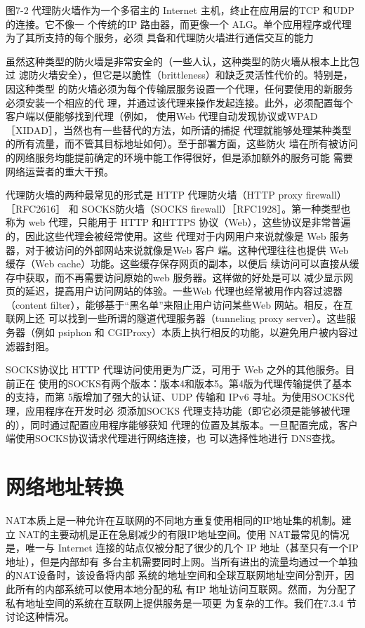 图7-2 代理防火墙作为一个多宿主的 Internet 主机，终止在应用层的TCP 和UDP 的连接。它不像一
个传统的IP 路由器，而更像一个 ALG。单个应用程序或代理为了其所支持的每个服务，必须
具备和代理防火墙进行通信交互的能力

虽然这种类型的防火墙是非常安全的（一些人认，这种类型的防火墻从根本上比包过
滤防火墻安全），但它是以脆性（brittleness）和缺乏灵活性代价的。特别是，因这种类型
的防火墙必须为每个传输层服务设置一个代理，任何要使用的新服务必须安装一个相应的代
理，并通过该代理来操作发起连接。此外，必须配置每个客户端以便能够找到代理（例如，
使用Web 代理自动发现协议或WPAD［XIDAD］，当然也有一些替代的方法，如所请的捕捉
代理就能够处理某种类型的所有流量，而不管其目标地址如何）。至于部署方面，这些防火
墙在所有被访问的网络服务均能提前确定的环境中能工作得很好，但是添加额外的服务可能
需要网络运营者的重大干预。

代理防火墻的两种最常见的形式是 HTTP 代理防火墙（HTTP proxy firewall） ［RFC2616］
和 SOCKS防火墙（SOCKS firewall）［RFC1928］。第一种类型也称为 web 代理，只能用于
HTTP 和HTTPS 协议（Web），这些协议是非常普遍的，因此这些代理会被经常使用。这些
代理对于内网用户来说就像是 Web 服务器，对于被访问的外部网站来说就像是Web 客户
端。这种代理往往也提供 Web 缓存（Web cache）功能。这些缓存保存网页的副本，以便后
续访问可以直接从缓存中获取，而不再需要访问原始的web 服务器。这样做的好处是可以
减少显示网页的延迟，提高用户访问网站的体验。一些Web 代理也经常被用作内容过滤器
（content filter），能够基于“黑名单”来阻止用户访问某些Web 网站。相反，在互联网上还
可以找到一些所谓的隧道代理服务器（tunneling proxy server）。这些服务器（例如 psiphon 和
CGIProxy）本质上执行相反的功能，以避免用户被内容过滤器封阻。

SOCKS协议比 HTTP 代理访问使用更为广泛，可用于 Web 之外的其他服务。目前正在
使用的SOCKS有两个版本：版本4和版本5。第4版为代理传输提供了基本的支持，而第
5版增加了强大的认证、UDP 传输和 IPv6 寻址。为使用SOCKS代理，应用程序在开发时必
须添加SOCKS 代理支持功能（即它必须是能够被代理的），同时通过配置应用程序能够获知
代理的位置及其版本。一旦配置完成，客户端使用SOCKS协议请求代理进行网络连接，也
可以选择性地进行 DNS查找。

\section{网络地址转换}

NAT本质上是一种允许在互联网的不同地方重复使用相同的IP地址集的机制。建立
NAT的主要动机是正在急剧减少的有限IP地址空间。使用 NAT最常见的情况是，唯一与
Internet 连接的站点仅被分配了很少的几个 IP 地址（甚至只有一个IP地址），但是内部却有
多台主机需要同时上网。当所有进出的流量均通过一个单独的NAT设备时，该设备将内部
系统的地址空间和全球互联网地址空间分割开，因此所有的内部系统可以使用本地分配的私
有IP 地址访问互联网。然而，为分配了私有地址空间的系统在互联网上提供服务是一项更
为复杂的工作。我们在7.3.4 节讨论这种情况。

